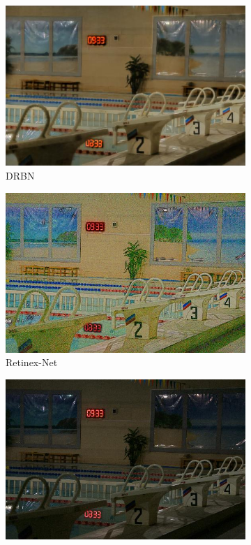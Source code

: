 \documentclass[a4paper]{ctexart}
\begin{document}
\begin{figure}[htb]
\begin{subfigure}{0.19\textwidth}
				\includegraphics[width=\linewidth]{picture/LLIE/Experiment/DRBN}
				\captionsetup{font=scriptsize}
				\caption{DRBN}
				\label{fig: DRBN}
			\end{subfigure}
			\begin{subfigure}{0.19\textwidth}
				\includegraphics[width=\linewidth]{picture/LLIE/Experiment/Retinex-Net}
				\captionsetup{font=scriptsize}
				\caption{Retinex-Net}
				\label{fig: Retinex-Net}
			\end{subfigure}
			\begin{subfigure}{0.19\textwidth}
				\includegraphics[width=\linewidth]{picture/LLIE/Experiment/RRDNet}

\end{subfigure}
\end{figure}
\end{document}
